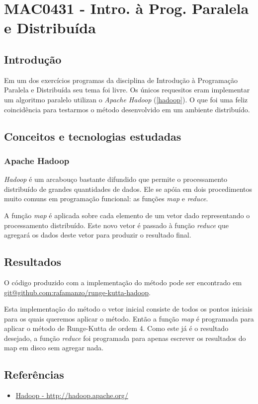 \chapter{MAC0431 - Intro. à Prog. Paralela e Distribuída}
\section{Introdução}
  Em um dos exercícios programas da disciplina de Introdução à Programação Paralela e Distribuída seu tema foi livre. Os únicos requesitos eram implementar um algoritmo paralelo utilizan o \textit{Apache Hadoop} (\ref{hadoop}). O que foi uma feliz coincidência para testarmos o método desenvolvido em um ambiente distribuído.

\section{Conceitos e tecnologias estudadas}
  \subsection{Apache Hadoop}
  \textit{Hadoop} é um arcabouço bastante difundido que permite o processamento distribuído de grandes quantidades de dados. Ele se apóia em dois procedimentos muito comuns em programação funcional: as funções \textit{map} e \textit{reduce}.
  
  A função \textit{map} é aplicada sobre cada elemento de um vetor dado representando o processamento distribuído. Este novo vetor é passado à função \textit{reduce} que agregará os dados deste vetor para produzir o resultado final.

\section{Resultados}
  O código produzido com a implementação do método pode ser encontrado em \href{git@github.com:rafamanzo/runge-kutta-hadoop}{git@github.com:rafamanzo/runge-kutta-hadoop}.
  
  Esta implementação do método o vetor inicial consiste de todos os pontos iniciais para os quais queremos aplicar o método. Então a função \textit{map} é programada para aplicar o método de Runge-Kutta de ordem 4. Como este já é o resultado desejado, a função \textit{reduce} foi programada para apenas escrever os resultados do map em disco sem agregar nada.

\section{Referências}
  \begin{itemize}
  \item \label{hadoop} \href{http://hadoop.apache.org/}{Hadoop - http://hadoop.apache.org/}
\end{itemize}
